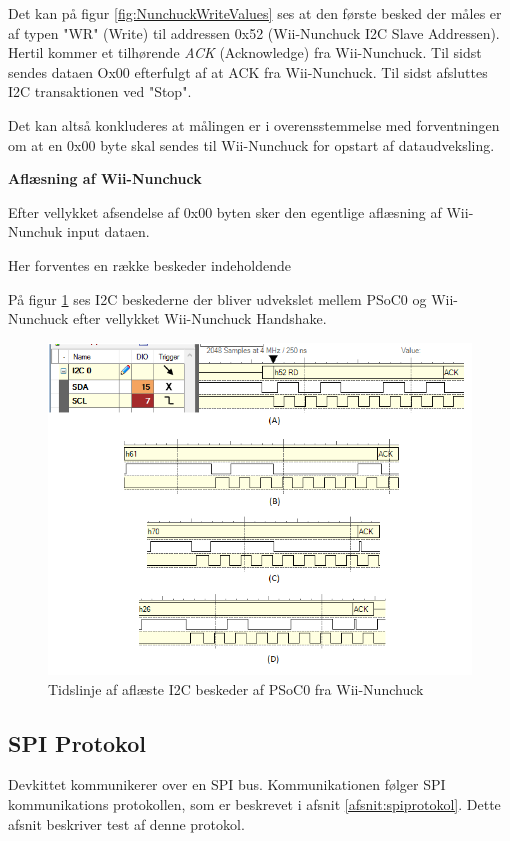 Det kan på figur \ref{fig:NunchuckWriteValues} ses at den første besked der måles er af typen "WR" (Write) til addressen 0x52 (Wii-Nunchuck I2C Slave Addressen). Hertil kommer et tilhørende \textit{ACK} (Acknowledge) fra Wii-Nunchuck. Til sidst sendes dataen Ox00 efterfulgt af at ACK fra Wii-Nunchuck. Til sidst afsluttes I2C transaktionen ved "Stop".

Det kan altså konkluderes at målingen er i overensstemmelse med forventningen om at en 0x00 byte skal sendes til Wii-Nunchuck for opstart af dataudveksling.

\textbf{Aflæsning af Wii-Nunchuck}

Efter vellykket afsendelse af 0x00 byten sker den egentlige aflæsning af Wii-Nunchuk input dataen.

Her forventes en række beskeder indeholdende 

På figur \ref{fig:NunchuckReadValues} ses I2C beskederne der bliver udvekslet mellem PSoC0 og Wii-Nunchuck efter vellykket Wii-Nunchuck Handshake. 

\begin{figure}[H]
	\centering
	\includegraphics[width=\textwidth]{Test/images/readvaluesEdited.png}
	\caption{Tidslinje af aflæste I2C beskeder af PSoC0 fra Wii-Nunchuck}
	\label{fig:NunchuckReadValues}
\end{figure}

\subsection{SPI Protokol}
Devkittet kommunikerer over en SPI bus. Kommunikationen følger SPI kommunikations protokollen, som er beskrevet i afsnit \ref{afsnit:spiprotokol}. Dette afsnit beskriver test af denne protokol.

